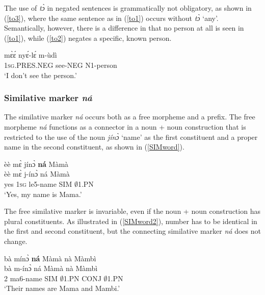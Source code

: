 The use of {\itshape tɔ̀} in negated sentences is grammatically not obligatory, as shown in (\ref{to3}), where the same sentence as in (\ref{to1}) occurs without {\itshape tɔ̀} `any'. Semantically, however, there is a difference in that no person at all is seen in (\ref{to1}), while (\ref{to2}) negates a specific, known person.

\begin{exe}
\ex\label{to3}
 \gll  mɛ̀ɛ́ nyɛ́-lɛ́ m-ùdì  \\
          1\textsc{sg}.PRES.NEG see-NEG N1-person  \\
    \trans `I don't see the person.'
\end{exe}




\subsubsection{Similative marker {\itshape ná}}
\label{sec:SIMword}

The similative marker {\itshape ná} occurs both as a free morpheme and a prefix. The free morpheme {\itshape ná} functions as a connector in a noun + noun construction that is restricted to the use of the noun {\itshape jínɔ̀} `name' as the first constituent and a proper name in the second constituent, as shown in (\ref{SIMword}).


\begin{exe} 
\ex\label{SIMword} 
  \glll èè mɛ̀ jínɔ̀ {\bfseries ná} Màmà \\
         èè mɛ̀ j-ínɔ̀ ná Màmà \\
       yes 1\textsc{sg} le5-name SIM $\emptyset$1.PN  \\
    \trans `Yes, my name is Mama.'
\end{exe}

The free similative marker is invariable, even if the noun + noun construction has plural constituents. As illustrated in (\ref{SIMword2}), number has to be identical in the first and second constituent, but the connecting similative marker {\itshape ná} does not change.

\begin{exe} 
\ex\label{SIMword2} 
  \glll bà mínɔ̀ {\bfseries ná} Màmà nà Màmbì \\
         bà m-ínɔ̀ ná Màmà nà Màmbì \\
        2 ma6-name SIM $\emptyset$1.PN  CONJ $\emptyset$1.PN \\
    \trans `Their names are Mama and Mambi.'
\end{exe}

